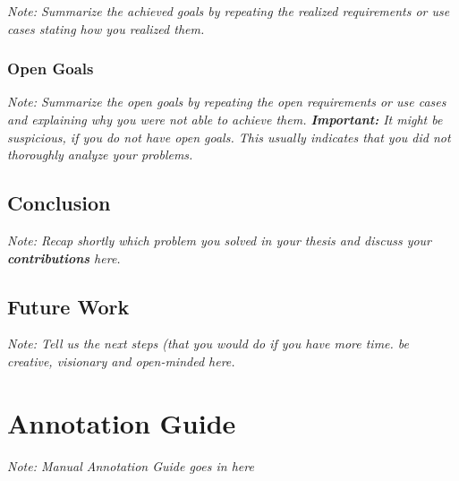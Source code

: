 \documentclass[a4paper,12pt,twoside]{report}
\begin{document}
\textit{Note: Summarize the achieved goals by repeating the realized requirements or use cases stating how you realized them.}

\subsection{Open Goals}

\textit{Note: Summarize the open goals by repeating the open requirements or use cases and explaining why you were not able to achieve them. \textbf{Important:} It might be suspicious, if you do not have open goals. This usually indicates that you did not thoroughly analyze your problems.}

\section{Conclusion}

\textit{Note: Recap shortly which problem you solved in your thesis and discuss your \textbf{contributions} here.}

\section{Future Work}

\textit{Note: Tell us the next steps  (that you would do if you have more time. be creative, visionary and open-minded here.}



\appendix

\chapter{Annotation Guide}

\textit{Note: Manual Annotation Guide goes in here}


\clearpage

\listoffigures
\clearpage

\listoftables
\clearpage



\end{document}
